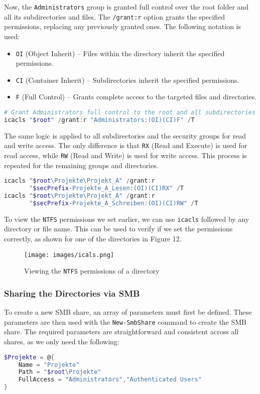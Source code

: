 \documentclass[a4paper]{article}
\newcommand{\abc}{\hfill \break}
\begin{document}
Now, the \texttt{Administrators} group is granted full control over the root folder and all its subdirectories and files. The \texttt{/grant:r} option grants the specified permissions, replacing any previously granted ones. The following notation is used:
\begin{itemize}
    \item \texttt{OI} (Object Inherit) – Files within the directory inherit the specified permissions.
    \item \texttt{CI} (Container Inherit) – Subdirectories inherit the specified permissions.
    \item \texttt{F} (Full Control) – Grants complete access to the targeted files and directories.
\end{itemize}
\cite{icals, NTFS-Permissions}
\begin{lstlisting}[language=PowerShell]
# Grant Administrators full control to the root and all subdirectories
icacls "$root" /grant:r "Administrators:(OI)(CI)F" /T
\end{lstlisting}
The same logic is applied to all subdirectories and the security groups for read and write access. The only difference is that \texttt{RX} (Read and Execute) is used for read access, while \texttt{RW} (Read and Write) is used for write access. This process is repeated for the remaining groups and directories.
\begin{lstlisting}[language=PowerShell]
icacls "$root\Projekte\Projekt_A" /grant:r 
       "$secPrefix-Projekte_A_Lesen:(OI)(CI)RX" /T
icacls "$root\Projekte\Projekt_A" /grant:r 
       "$secPrefix-Projekte_A_Schreiben:(OI)(CI)RW" /T
\end{lstlisting}
\newpage
To view the \texttt{NTFS} permissions we set earlier, we can use \texttt{icacls} followed by any directory or file name. This can be used to verify if we set the permissions correctly, as shown for one of the directories in Figure 12.
\begin{figure}[!htb]
	\texttt{[image: images/icals.png]}
	\centering
	\caption{Viewing the \texttt{NTFS} permissions of a directory}
\end{figure}
\subsubsection{Sharing the Directories via SMB}
To create a new SMB share, an array of parameters must first be defined. These parameters are then used with the \texttt{New-SmbShare} command to create the SMB share.\abc
The required parameters are straightforward and consistent across all shares, as we only need the following:
\begin{lstlisting}[language=PowerShell]
$Projekte = @{
    Name = "Projekte"
    Path = "$root\Projekte"
    FullAccess = "Administrators","Authenticated Users"
}
\end{lstlisting}
\end{document}
